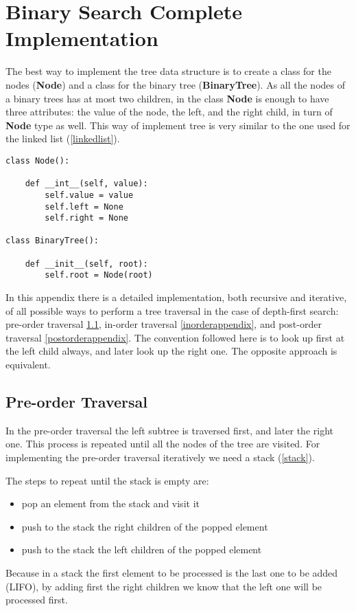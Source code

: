 \chapter{Binary Search Complete Implementation}
\label{binappendix}
The best way to implement the tree data structure is to create a class for the nodes (\textbf{Node}) and a class for the binary tree (\textbf{BinaryTree}). As all the nodes of a binary trees has at most two children, in the class \textbf{Node} is enough to have three attributes: the value of the node, the left, and the right child, in turn of \textbf{Node} type as well. This way of implement tree is very similar to the one used for the linked list (\ref{linkedlist}).

\begin{lstlisting}[firstnumber=1, caption={Class definition for a node and a tree.}]
class Node():

	def __int__(self, value):
		self.value = value
		self.left = None
		self.right = None

class BinaryTree():

	def __init__(self, root):
		self.root = Node(root)
\end{lstlisting}

In this appendix there is a detailed implementation, both recursive and iterative, of all possible ways to perform a tree traversal in the case of depth-first search: pre-order traversal \ref{preorderappendix}, in-order traversal \ref{inorderappendix}, and post-order traversal \ref{postorderappendix}. The convention followed here is to look up first at the left child always, and later look up the right one. The opposite approach is equivalent.

\section{Pre-order Traversal}
\label{preorderappendix}
In the pre-order traversal the left subtree is traversed first, and later the right one. This process is repeated until all the nodes of the tree are visited. For implementing the pre-order traversal iteratively we need a stack (\ref{stack}).

The steps to repeat until the stack is empty are:
\begin{itemize}
\item pop an element from the stack and visit it
\item push to the stack the right children of the popped element
\item push to the stack the left children of the popped element
\end{itemize}
Because in a stack the first element to be processed is the last one to be added (LIFO), by adding first the right children we know that the left one will be processed first.

